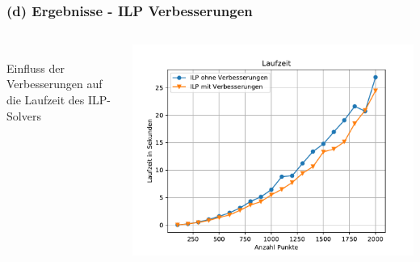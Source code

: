 \documentclass[aspectratio=169]{beamer}
\begin{document}

\begin{frame}
	\frametitle{(d) Ergebnisse - ILP Verbesserungen}
	\begin{columns}[c] %
	
	\textbf{}\\
	Einfluss der Verbesserungen auf die Laufzeit des ILP-Solvers
	
	
	\includegraphics[scale=.45]{laufzeit_ilp_verbesserung.pdf}
	

	\end{columns}
	\end{frame}

\end{document}
